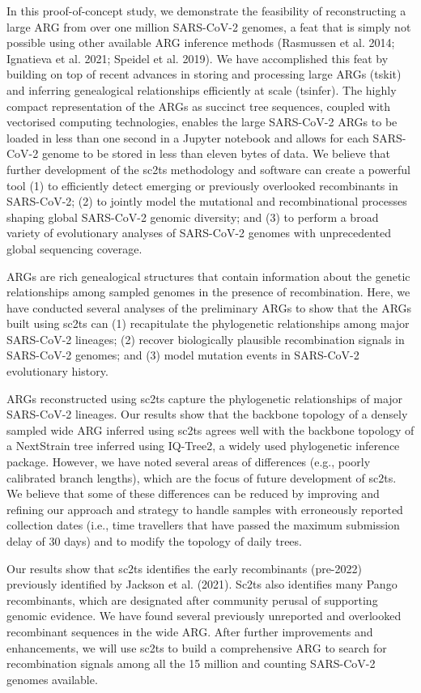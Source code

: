 \documentclass{article}
\begin{document}
In this proof-of-concept study, we demonstrate the feasibility of
reconstructing a large ARG from over one million SARS-CoV-2 genomes, a feat
that is simply not possible using other available ARG inference methods
(Rasmussen et al. 2014; Ignatieva et al. 2021; Speidel et al. 2019). We have
accomplished this feat by building on top of recent advances in storing and
processing large ARGs (tskit) and inferring genealogical relationships
efficiently at scale (tsinfer). The highly compact representation of the ARGs
as succinct tree sequences, coupled with vectorised computing technologies,
enables the large SARS-CoV-2 ARGs to be loaded in less than one second in a
Jupyter notebook and allows for each SARS-CoV-2 genome to be stored in less
than eleven bytes of data. We believe that further development of the sc2ts
methodology and software can create a powerful tool (1) to efficiently detect
emerging or previously overlooked recombinants in SARS-CoV-2; (2) to jointly
model the mutational and recombinational processes shaping global SARS-CoV-2
genomic diversity; and (3) to perform a broad variety of evolutionary analyses
of SARS-CoV-2 genomes with unprecedented global sequencing coverage.

ARGs are rich genealogical structures that contain information about the
genetic relationships among sampled genomes in the presence of recombination.
Here, we have conducted several analyses of the preliminary ARGs to show that
the ARGs built using sc2ts can (1) recapitulate the phylogenetic relationships
among major SARS-CoV-2 lineages; (2) recover biologically plausible
recombination signals in SARS-CoV-2 genomes; and (3) model mutation events in
SARS-CoV-2 evolutionary history.

ARGs reconstructed using sc2ts capture the phylogenetic relationships of major
SARS-CoV-2 lineages. Our results show that the backbone topology of a densely
sampled wide ARG inferred using sc2ts agrees well with the backbone topology of
a NextStrain tree inferred using IQ-Tree2, a widely used phylogenetic inference
package. However, we have noted several areas of differences (e.g., poorly
calibrated branch lengths), which are the focus of future development of sc2ts.
We believe that some of these differences can be reduced by improving and
refining our approach and strategy to handle samples with erroneously reported
collection dates (i.e., time travellers that have passed the maximum submission
delay of 30 days) and to modify the topology of daily trees.

Our results show that sc2ts identifies the early recombinants (pre-2022)
previously identified by Jackson et al. (2021). Sc2ts also identifies many
Pango recombinants, which are designated after community perusal of supporting
genomic evidence. We have found several previously unreported and overlooked
recombinant sequences in the wide ARG. After further improvements and
enhancements, we will use sc2ts to build a comprehensive ARG to search for
recombination signals among all the 15 million and counting SARS-CoV-2 genomes
available.
\end{document}
